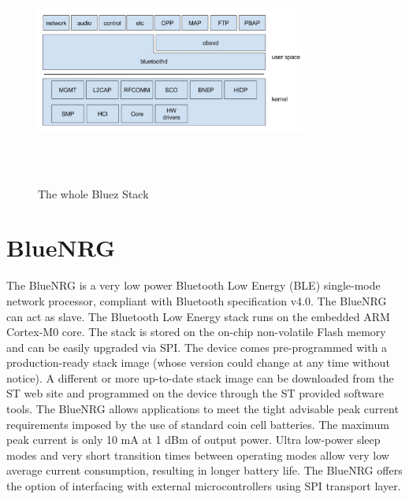 \begin{figure}[ht]
	\centering
	\includegraphics[width=3.5in, height=3in]{images/whole_bluez.png}
	\caption{The whole Bluez Stack}
\end{figure}
\iffalse
\section{BlueNRG}
The BlueNRG is a very low power Bluetooth Low Energy (BLE) single-mode network processor, compliant with Bluetooth specification v4.0. The BlueNRG can act as slave. The Bluetooth Low Energy stack runs on the embedded ARM Cortex-M0 core. The stack is stored on the on-chip non-volatile Flash memory and can be easily upgraded via SPI. The device comes pre-programmed with a production-ready stack image (whose version could change at any time without notice). A different or more up-to-date stack image can be downloaded from the ST web site and programmed on the device through the ST provided software tools. The BlueNRG allows applications to meet the tight advisable peak current requirements imposed by the use of standard coin cell batteries. The maximum peak current is only 10 mA at 1 dBm of output power. Ultra low-power sleep modes and very short transition times between operating modes allow very low average current consumption, resulting in longer battery life. The BlueNRG offers the option of interfacing with external microcontrollers using SPI transport layer.
